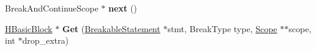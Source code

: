 \begin{DoxyCompactItemize}
\item 
Break\+And\+Continue\+Scope $\ast$ {\bfseries next} ()\hypertarget{classv8_1_1internal_1_1_h_optimized_graph_builder_1_1_b_a_s_e___e_m_b_e_d_d_e_d_a8df3ee059b066aa9ced62ce7a863dba5}{}\label{classv8_1_1internal_1_1_h_optimized_graph_builder_1_1_b_a_s_e___e_m_b_e_d_d_e_d_a8df3ee059b066aa9ced62ce7a863dba5}

\item 
\hyperlink{classv8_1_1internal_1_1_h_basic_block}{H\+Basic\+Block} $\ast$ {\bfseries Get} (\hyperlink{classv8_1_1internal_1_1_breakable_statement}{Breakable\+Statement} $\ast$stmt, Break\+Type type, \hyperlink{classv8_1_1internal_1_1_scope}{Scope} $\ast$$\ast$scope, int $\ast$drop\+\_\+extra)\hypertarget{classv8_1_1internal_1_1_h_optimized_graph_builder_1_1_b_a_s_e___e_m_b_e_d_d_e_d_a45d989f82f1d8f1f7de8731914d79c5c}{}\label{classv8_1_1internal_1_1_h_optimized_graph_builder_1_1_b_a_s_e___e_m_b_e_d_d_e_d_a45d989f82f1d8f1f7de8731914d79c5c}

\end{DoxyCompactItemize}
